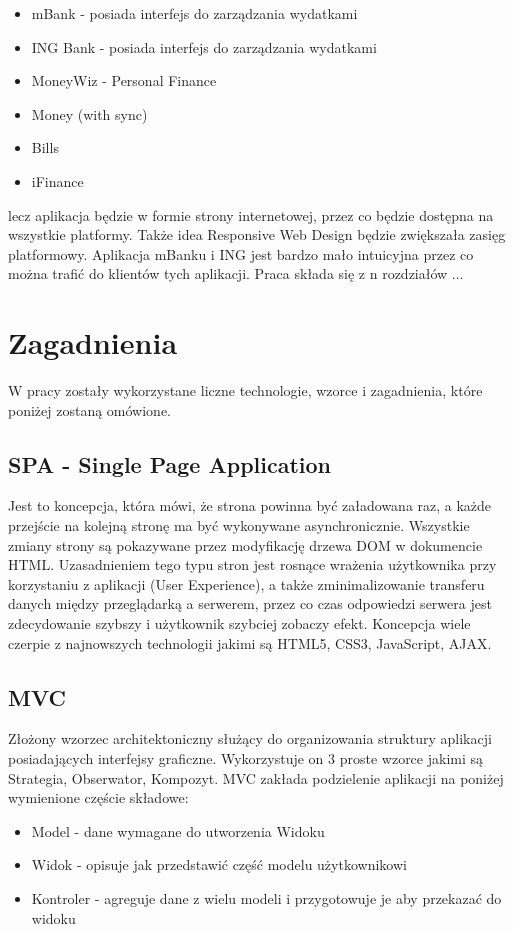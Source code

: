 \documentclass[10pt,titlepage]{article}
\begin{document}
\begin{itemize}
  \item mBank - posiada interfejs do zarządzania wydatkami
  \item ING Bank - posiada interfejs do zarządzania wydatkami
  \item MoneyWiz - Personal Finance
  \item Money (with sync)
  \item Bills
  \item iFinance
\end{itemize}
lecz aplikacja będzie w formie strony internetowej, przez co będzie dostępna na wszystkie platformy. Także idea Responsive Web Design będzie zwiększała zasięg platformowy. Aplikacja mBanku i ING jest bardzo mało intuicyjna przez co można trafić do klientów tych aplikacji. Praca składa się z n rozdziałów ...

\section{Zagadnienia}
W pracy zostały wykorzystane liczne technologie, wzorce i zagadnienia, które poniżej zostaną omówione.
\subsection{SPA - Single Page Application}
Jest to koncepcja, która mówi, że strona powinna być załadowana raz, a każde przejście na kolejną stronę ma być wykonywane asynchronicznie. Wszystkie zmiany strony są pokazywane przez modyfikację drzewa DOM w dokumencie HTML. Uzasadnieniem tego typu stron jest rosnące wrażenia użytkownika przy korzystaniu z aplikacji (User Experience), a także zminimalizowanie transferu danych między przeglądarką a serwerem, przez co czas odpowiedzi serwera jest zdecydowanie szybszy i użytkownik szybciej zobaczy efekt. Koncepcja wiele czerpie z najnowszych technologii jakimi są HTML5, CSS3, JavaScript, AJAX.
\subsection{MVC}
Złożony wzorzec architektoniczny służący do organizowania struktury aplikacji posiadających interfejsy graficzne. Wykorzystuje on 3 proste wzorce jakimi są Strategia, Obserwator, Kompozyt.\linebreak
MVC zakłada podzielenie aplikacji na poniżej wymienione częście składowe:
\begin{itemize}
  \item Model - dane wymagane do utworzenia Widoku
  \item Widok - opisuje jak przedstawić część modelu użytkownikowi
  \item Kontroler - agreguje dane z wielu modeli i przygotowuje je aby przekazać do widoku
\end{itemize}
\end{document}
